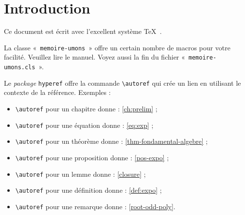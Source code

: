 \chapter{Introduction}

Ce document est écrit avec l'excellent système \TeX\
\autocite{knuth_texbook_1986}.

La classe «~\texttt{memoire-umons}~» offre un certain nombre de macros
pour votre facilité.  Veuillez lire le manuel.  Voyez aussi la fin du
fichier «~\texttt{memoire-\linebreak[2]umons.cls}~».

\bigskip

Le \emph{package} \texttt{hyperef} offre la commande \verb+\autoref+
qui crée un lien en utilisant le contexte de la référence.  Exemples :
\begin{itemize}
\item \verb/\autoref/ pour un chapitre donne : \autoref{ch:prelim} ;
\item \verb/\autoref/ pour une équation donne : \autoref{eq:exp} ;
\item \verb/\autoref/ pour un théorème donne :
  \autoref{thm-fondamental-algebre} ;
\item \verb/\autoref/ pour une proposition donne : \autoref{pos-expo} ;
\item \verb/\autoref/ pour un lemme donne : \autoref{closure} ;
\item \verb/\autoref/ pour une définition donne : \autoref{def:expo} ;
\item \verb/\autoref/ pour une remarque donne :
  \autoref{root-odd-poly}.
\end{itemize}


